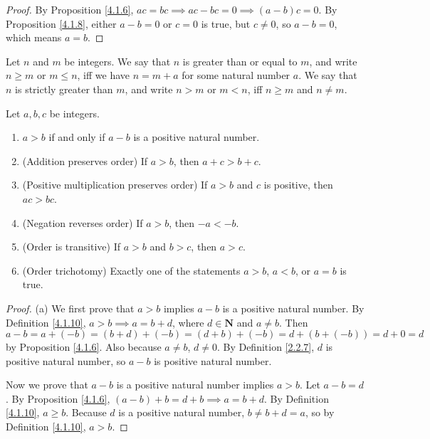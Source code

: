 \begin{proof}
By Proposition \ref{4.1.6}, \(ac = bc \implies ac - bc = 0 \implies (a - b)c = 0\).
By Proposition \ref{4.1.8}, either \(a - b = 0\) or \(c = 0\) is true, but \(c \neq 0\), so \(a - b = 0\), which means \(a = b\).
\end{proof}

\begin{definition}\label{4.1.10}
Let \(n\) and \(m\) be integers.
We say that \(n\) is greater than or equal to \(m\), and write \(n \geq m\) or \(m \leq n\), iff we have \(n = m + a\) for some natural number \(a\).
We say that \(n\) is strictly greater than \(m\), and write \(n > m\) or \(m < n\), iff \(n \geq m\) and \(n \neq m\).
\end{definition}

\begin{lemma}\label{4.1.11}
Let \(a, b, c\) be integers.
\begin{enumerate}
    \item \(a > b\) if and only if \(a - b\) is a positive natural number.
    \item (Addition preserves order) If \(a > b\), then \(a + c > b + c\).
    \item (Positive multiplication preserves order) If \(a > b\) and \(c\) is positive, then \(ac > bc\).
    \item (Negation reverses order) If \(a > b\), then \(-a < -b\).
    \item (Order is transitive) If \(a > b\) and \(b > c\), then \(a > c\).
    \item (Order trichotomy) Exactly one of the statements \(a > b\), \(a < b\), or \(a = b\) is true.
\end{enumerate}
\end{lemma}

\begin{proof}{(a)}
We first prove that \(a > b\) implies \(a - b\) is a positive natural number.
By Definition \ref{4.1.10}, \(a > b \implies a = b + d\), where \(d \in \mathbf{N}\) and \(a \neq b\).
Then \(a - b = a + (-b) = (b + d) + (-b) = (d + b) + (-b) = d + (b + (-b)) = d + 0 = d\) by Proposition \ref{4.1.6}.
Also because \(a \neq b\), \(d \neq 0\).
By Definition \ref{2.2.7}, \(d\) is positive natural number, so \(a - b\) is positive natural number.

Now we prove that \(a - b\) is a positive natural number implies \(a > b\).
Let \(a - b = d\).
By Proposition \ref{4.1.6}, \((a - b) + b = d + b \implies a = b + d\).
By Definition \ref{4.1.10}, \(a \geq b\).
Because \(d\) is a positive natural number, \(b \neq b + d = a\), so by Definition \ref{4.1.10}, \(a > b\).
\end{proof}

